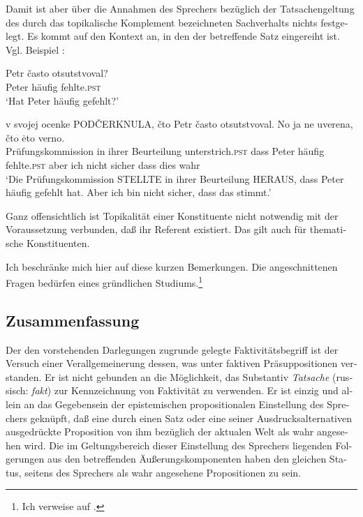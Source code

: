 \documentclass[output=paper]{langscibook}
\begin{document}
\begin{otherlanguage}{german}
\noindent Damit ist aber über die Annahmen des Sprechers bezüglich der Tatsachengeltung des durch das topikalische Komplement bezeichneten Sachverhalts nichts festgelegt. Es kommt auf den Kontext an, in den der betreffende Satz eingereiht ist. Vgl. Beispiel :

\begin{exe}
    \ex \label{ex:zi83:61}
        \begin{xlist}
                \gll Petr často otsutstvoval? \\
                Peter häufig fehlte.\textsc{pst} \\
                \glt ‘Hat Peter häufig gefehlt?’
                
                 v svojej ocenke PODČERKNULA, čto Petr často otsutstvoval. No ja ne uverena, čto ėto verno. \\
                 Prüfungskommission in ihrer Beurteilung unterstrich.\textsc{pst} dass Peter häufig fehlte.\textsc{pst} aber ich nicht  sicher dass dies wahr \\
                 \glt ‘Die Prüfungskommission STELLTE in ihrer Beurteilung HERAUS, dass Peter häufig gefehlt hat. Aber ich bin nicht sicher, dass das stimmt.’
                
        \end{xlist}
\end{exe}

\noindent Ganz offensichtlich ist Topikalität einer Konstituente nicht notwendig mit der Voraussetzung verbunden, daß ihr Referent existiert. Das gilt auch für the\-ma\-ti\-sche Konstituenten.

Ich beschränke mich hier auf diese kurzen Bemerkungen. Die angeschnittenen Fragen bedürfen eines gründlichen Studiums.\footnote{Ich verweise auf \citet{pasch1983mechanismen-der-inhaltlichen-gliederung-von-satzen}.}

\subsection{Zusammenfassung} \label{sec:zi83:3.5}
\largerpage[2]
Der den vorstehenden Darlegungen zugrunde gelegte Faktivitätsbegriff ist der Versuch einer Verallgemeinerung dessen, was \citet{kiparsky1970fact} unter faktiven Präsuppositionen verstanden. Er ist nicht gebunden an die Möglichkeit, das Substantiv \textit{Tatsache} (russisch: \textit{fakt}) zur Kennzeichnung von Faktivität zu verwenden. Er ist einzig und allein an das Gegebensein der epistemischen propositionalen Einstellung des Sprechers geknüpft, daß eine durch einen Satz oder eine seiner Ausdrucksalternativen ausgedrückte Proposition von ihm bezüglich der aktualen Welt als wahr angesehen wird. Die im Geltungsbereich dieser Einstellung des Sprechers liegenden Folgerungen aus den betreffenden Äußerungskomponenten haben den gleichen Status, seitens des Sprechers als wahr angesehene Propositionen zu sein.


\end{otherlanguage}
\end{document}

